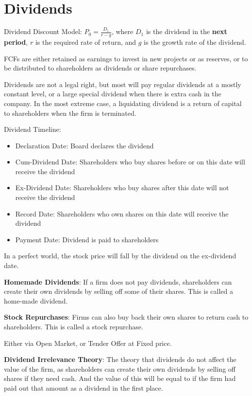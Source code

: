 \section{Dividends}
Dividend Discount Model: $P_0 = \frac{D_1}{r-g}$, where $D_1$ is the dividend in the \textbf{next period}, $r$ is the required rate of return, and $g$ is the growth rate of the dividend.

FCFs are either retained as earnings to invest in new projects or as reserves, or to be distributed to shareholders as dividends or share repurchases.

Dividends are not a legal right, but most will pay regular dividends at a mostly constant level, or a large special dividend when there is extra cash in the company. In the most extreme case, a liquidating dividend is a return of capital to shareholders when the firm is terminated.

Dividend Timeline:
\begin{itemize}
    \item Declaration Date: Board declares the dividend
    \item Cum-Dividend Date: Shareholders who buy shares before or on this date will receive the dividend
    \item Ex-Dividend Date: Shareholders who buy shares after this date will not receive the dividend
    \item Record Date: Shareholders who own shares on this date will receive the dividend
    \item Payment Date: Dividend is paid to shareholders
\end{itemize}

In a perfect world, the stock price will fall by the dividend on the ex-dividend date.

\textbf{Homemade Dividends}:
If a firm does not pay dividends, shareholders can create their own dividends by selling off some of their shares. This is called a home-made dividend.

\textbf{Stock Repurchases}:
Firms can also buy back their own shares to return cash to shareholders. This is called a stock repurchase.

Either via Open Market, or Tender Offer at Fixed price.

\textbf{Dividend Irrelevance Theory}:
The theory that dividends do not affect the value of the firm, as shareholders can create their own dividends by selling off shares if they need cash. And the value of this will be equal to if the firm had paid out that amount as a dividend in the first place.

